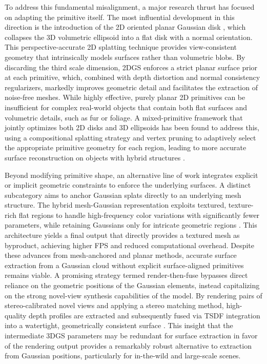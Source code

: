 \documentclass[11pt,a4paper]{article}
\begin{document}
To address this fundamental misalignment, a major research thrust has focused on adapting the primitive itself. The most influential development in this direction is the introduction of the 2D oriented planar Gaussian disk \cite{arxiv:2403.17888v1}, which collapses the 3D volumetric ellipsoid into a flat disk with a normal orientation. This perspective-accurate 2D splatting technique provides view-consistent geometry that intrinsically models surfaces rather than volumetric blobs. By discarding the third scale dimension, 2DGS enforces a strict planar surface prior at each primitive, which, combined with depth distortion and normal consistency regularizers, markedly improves geometric detail and facilitates the extraction of noise-free meshes. While highly effective, purely planar 2D primitives can be insufficient for complex real-world objects that contain both flat surfaces and volumetric details, such as fur or foliage. A mixed-primitive framework that jointly optimizes both 2D disks and 3D ellipsoids has been found to address this, using a compositional splatting strategy and vertex pruning to adaptively select the appropriate primitive geometry for each region, leading to more accurate surface reconstruction on objects with hybrid structures \cite{arxiv:2507.11321v1}.

Beyond modifying primitive shape, an alternative line of work integrates explicit or implicit geometric constraints to enforce the underlying surfaces. A distinct subcategory aims to anchor Gaussian splats directly to an underlying mesh structure. The hybrid mesh-Gaussian representation exploits textured, texture-rich flat regions to handle high-frequency color variations with significantly fewer parameters, while retaining Gaussians only for intricate geometric regions \cite{arxiv:2506.06988v1}. This architecture yields a final output that directly provides a textured mesh as byproduct, achieving higher FPS and reduced computational overhead. Despite these advances from mesh-anchored and planar methods, accurate surface extraction from a Gaussian cloud without explicit surface-aligned primitives remains viable. A promising strategy termed render-then-fuse bypasses direct reliance on the geometric positions of the Gaussian elements, instead capitalizing on the strong novel-view synthesis capabilities of the model. By rendering pairs of stereo-calibrated novel views and applying a stereo matching method, high-quality depth profiles are extracted and subsequently fused via TSDF integration into a watertight, geometrically consistent surface \cite{arxiv:2404.01810v1}. This insight that the intermediate 3DGS parameters may be redundant for surface extraction in favor of the rendering output provides a remarkably robust alternative to extraction from Gaussian positions, particularly for in-the-wild and large-scale scenes.
\end{document}
